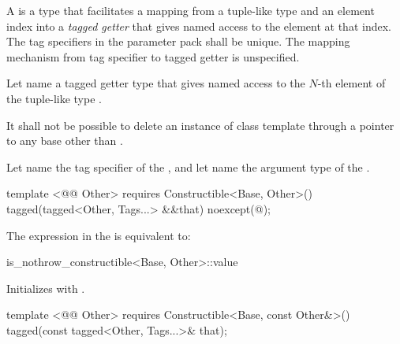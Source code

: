 {\pnum
A  is a type that facilitates a mapping from a tuple-like type and an
element index into a \textit{tagged getter} that gives named access to the element at that index.
 The tag specifiers in the
 parameter pack shall be unique. \enternote The mapping mechanism from tag specifier to
tagged getter is unspecified.\exitnote

\pnum Let  name a tagged getter type that gives named
access to the $N$-th element of the tuple-like type .

\pnum It shall not be possible to delete an instance of class template  through a
pointer to any base other than .

\pnum
{}
 Let
 name the tag specifier of the  , and let
 name the argument type of the  .

\begin{itemdecl}
template <@@ Other>
  requires Constructible<Base, Other>()
tagged(tagged<Other, Tags...> &&that) noexcept(@\seebelow@);
\end{itemdecl}

\begin{itemdescr}
\pnum
\remarks The expression in the  is equivalent to:

\begin{codeblock}
is_nothrow_constructible<Base, Other>::value
\end{codeblock}

\pnum
\effects Initializes  with .
\end{itemdescr}

\begin{itemdecl}
template <@@ Other>
  requires Constructible<Base, const Other&>()
tagged(const tagged<Other, Tags...>& that);
\end{itemdecl}

}
